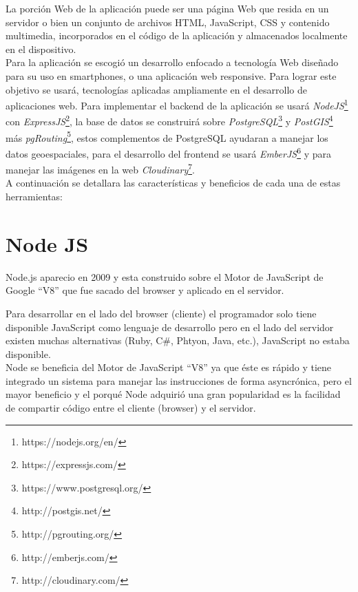       La porción Web de la aplicación puede ser una página Web que resida en un servidor o bien un conjunto de archivos HTML, JavaScript, CSS y contenido multimedia, incorporados en el código de la aplicación y almacenados localmente en el dispositivo\cite{IBM_Mobile}.\\




  Para la aplicación se escogió un desarrollo enfocado a tecnología Web diseñado para su uso en smartphones, o una aplicación web responsive. Para lograr este objetivo se usará, tecnologías aplicadas ampliamente en el desarrollo de aplicaciones web.
  Para implementar el backend de la aplicación se usará \emph{NodeJS}\footnote{https://nodejs.org/en/} con \emph{ExpressJS}\footnote{https://expressjs.com/}, la base de datos se construirá sobre \emph{PostgreSQL}\footnote{https://www.postgresql.org/} y \emph{PostGIS}\footnote{http://postgis.net/} más \emph{pgRouting}\footnote{http://pgrouting.org/}, estos complementos de PostgreSQL ayudaran a manejar los datos geoespaciales, para el desarrollo del frontend se usará \emph{EmberJS}\footnote{http://emberjs.com/} y para manejar las imágenes en la web \emph{Cloudinary}\footnote{http://cloudinary.com/}.\\

  A continuación se detallara las características y beneficios de cada una de estas herramientas:

  \section{Node JS}
  \label{sec:node_js}
    Node.js aparecio en 2009 y esta construido sobre el Motor de JavaScript de Google ``V8'' que fue sacado del browser y aplicado en el servidor.

    Para desarrollar en el lado del browser (cliente) el programador solo tiene disponible JavaScript como lenguaje de desarrollo pero en el lado del servidor existen muchas alternativas (Ruby, C\#, Phtyon, Java, etc.), JavaScript no estaba disponible.\\

    Node se beneficia del Motor de JavaScript ``V8'' ya que \'este es r\'apido y tiene integrado un sistema para manejar las instrucciones de forma asyncr\'onica, pero el mayor beneficio y el porqu\'e Node adquiri\'o una gran popularidad es la facilidad de compartir c\'odigo entre el cliente (browser) y el servidor.\\

